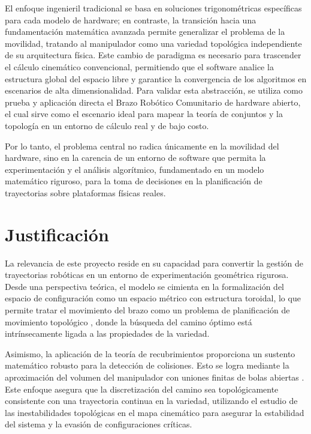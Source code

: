 El enfoque ingenieril tradicional se basa en soluciones trigonométricas 
específicas para cada modelo de hardware; en contraste, la transición 
hacia una fundamentación matemática avanzada permite generalizar el 
problema de la movilidad, tratando al manipulador como una variedad 
topológica independiente de su arquitectura física. Este cambio de paradigma
es necesario para trascender el cálculo cinemático convencional, 
permitiendo que el software analice la estructura global del espacio libre 
y garantice la convergencia de los algoritmos en escenarios de alta 
dimensionalidad. Para validar esta abstracción, se utiliza como prueba 
y aplicación directa el Brazo Robótico Comunitario de hardware abierto, el cual 
sirve como el escenario ideal para mapear la teoría de conjuntos y la 
topología en un entorno de cálculo real y de bajo costo.

Por lo tanto, el problema central no radica únicamente en la movilidad 
del hardware, sino en la carencia de un entorno de software que permita 
la experimentación y el análisis algorítmico, fundamentado en un modelo 
matemático riguroso, para la toma de decisiones en la planificación de 
trayectorias sobre plataformas físicas reales.



\section{Justificación}
La relevancia de este proyecto reside en su capacidad para convertir 
la gestión de trayectorias robóticas en un entorno de experimentación 
geométrica rigurosa. Desde una perspectiva teórica, el modelo 
se cimienta en la formalización del espacio de configuración como un 
espacio métrico con estructura toroidal, lo que permite tratar el 
movimiento del brazo como un problema de planificación de movimiento 
topológico \parencite{farber2008}, donde la búsqueda del camino óptimo 
está intrínsecamente ligada a las propiedades de la variedad.

Asimismo, la aplicación de la teoría de recubrimientos proporciona un 
sustento matemático robusto para la detección de colisiones. Esto se logra 
mediante la aproximación del volumen del manipulador con uniones finitas de 
bolas abiertas \parencite{coumar2025foam}. Este enfoque asegura que 
la discretización del camino sea topológicamente consistente con una 
trayectoria continua en la variedad, utilizando el estudio de las 
inestabilidades topológicas en el mapa cinemático \parencite{Mosquera2017} 
para asegurar la estabilidad del sistema y la evasión de configuraciones 
críticas.

